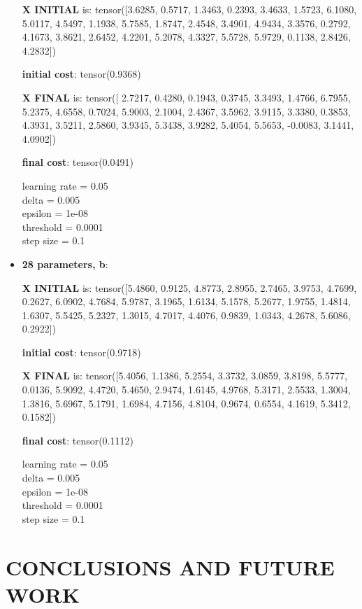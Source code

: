 \documentclass[inscr,ack,preface]{diphdthesis}
\begin{document}
\begin{itemize}
\textbf{X INITIAL} is:
 tensor([3.6285, 0.5717, 1.3463, 0.2393, 3.4633, 1.5723, 6.1080, 5.0117, 4.5497,
        1.1938, 5.7585, 1.8747, 2.4548, 3.4901, 4.9434, 3.3576, 0.2792, 4.1673,
        3.8621, 2.6452, 4.2201, 5.2078, 4.3327, 5.5728, 5.9729, 0.1138, 2.8426,
        4.2832])
        
\textbf{initial cost}: tensor(0.9368)

\textbf{X FINAL} is:
tensor([ 2.7217,  0.4280,  0.1943,  0.3745,  3.3493,  1.4766,  6.7955,  5.2375,
         4.6558,  0.7024,  5.9003,  2.1004,  2.4367,  3.5962,  3.9115,  3.3380,
         0.3853,  4.3931,  3.5211,  2.5860,  3.9345,  5.3438,  3.9282,  5.4054,
         5.5653, -0.0083,  3.1441,  4.0902])

\textbf{final cost}: tensor(0.0491)

learning rate =  0.05 \\
delta =  0.005 \\
epsilon =  1e-08 \\
threshold =  0.0001\\ 
step size =  0.1 \\

\item \textbf{28 parameters,  b}: 

\textbf{X INITIAL}  is:
 tensor([5.4860, 0.9125, 4.8773, 2.8955, 2.7465, 3.9753, 4.7699, 0.2627, 6.0902,
        4.7684, 5.9787, 3.1965, 1.6134, 5.1578, 5.2677, 1.9755, 1.4814, 1.6307,
        5.5425, 5.2327, 1.3015, 4.7017, 4.4076, 0.9839, 1.0343, 4.2678, 5.6086,
        0.2922])
        
\textbf{initial cost}: tensor(0.9718)

\textbf{X FINAL} is:
 tensor([5.4056, 1.1386, 5.2554, 3.3732, 3.0859, 3.8198, 5.5777, 0.0136, 5.9092,
        4.4720, 5.4650, 2.9474, 1.6145, 4.9768, 5.3171, 2.5533, 1.3004, 1.3816,
        5.6967, 5.1791, 1.6984, 4.7156, 4.8104, 0.9674, 0.6554, 4.1619, 5.3412,
        0.1582])

\textbf{final cost}: tensor(0.1112)

learning rate =  0.05 \\
delta =  0.005 \\
epsilon =  1e-08 \\
threshold =  0.0001\\ 
step size =  0.1 \\

\end{itemize}

\chapter{CONCLUSIONS AND FUTURE WORK}
\end{document}
